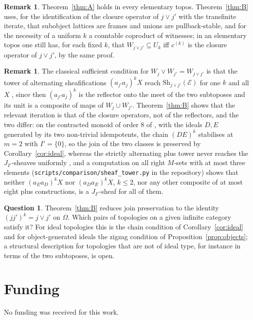 \documentclass[11pt]{amsart}
\theoremstyle{definition}
\newtheorem{rem}[thm]{Remark}
\newtheorem{que}[thm]{Question}
\newcommand{\Sh}{\mathrm{Sh}}
\newcommand{\cE}{\mathcal E}
\begin{document}
\begin{rem}
Theorem~\ref{thm:A} holds in every elementary topos. Theorem~\ref{thm:B}
uses, for the identification of the closure operator of $j\vee j'$ with the
transfinite iterate, that subobject lattices are frames and unions are
pullback-stable, and for the necessity of a uniform $k$ a countable
coproduct of witnesses; in an elementary topos one still has, for each
fixed $k$, that $W_{j\vee j'}\subseteq U_k$ iff $c^{(k)}$ is the closure
operator of $j\vee j'$, by the same proof.
\end{rem}

\begin{rem}
The classical sufficient condition for $W_j\vee W_{j'}=W_{j\vee j'}$ is
that the tower of alternating sheafifications $(a_{j'}a_j)^kX$ reach
$\Sh_{j\vee j'}(\cE)$ for one $k$ and all $X$ \cite[Thm.~4.1]{Postnikov},
since then $(a_{j'}a_j)^k$ is the reflector onto the meet of the two
subtoposes and its unit is a composite of maps of $W_j\cup W_{j'}$.
Theorem~\ref{thm:B} shows that the relevant iteration is that of the
closure operators, not of the reflectors, and the two differ: on the
contracted monoid of order $8$ of \cite[\S7]{Finitejoin}, with the ideals
$D,E$ generated by its two non-trivial idempotents, the chain $(DE)^k$
stabilises at $m=2$ with $I'=\{0\}$, so the join of the two classes is
preserved by Corollary~\ref{cor:ideal}, whereas the strictly alternating
plus tower never reaches the $J_{I'}$-sheaves uniformly
\cite[Prop.~7.1]{Finitejoin}, and a computation on all right $M$-sets with
at most three elements (\texttt{scripts/comparison/sheaf\_tower.py} in the
repository) shows that neither $(a_Ea_D)^kX$ nor $(a_Da_E)^kX$, $k\le2$, nor
any other composite of at most eight plus constructions, is a
$J_{I'}$-sheaf for all of them.
\end{rem}

\begin{que}
Theorem~\ref{thm:B} reduces join preservation to the identity
$(jj')^k=j\vee j'$ on $\Omega$. Which pairs of topologies on a given infinite
category satisfy it? For ideal topologies this is the chain condition of
Corollary~\ref{cor:ideal} and for object-generated ideals the zigzag condition
of Proposition~\ref{prop:objects}; a structural description for topologies
that are not of ideal type, for instance in terms of the two subtoposes,
is open.
\end{que}

\section*{Funding}
No funding was received for this work.
\end{document}
